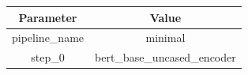 \begin{tabular}{|c||c|}
\toprule
Parameter & Value \\ \midrule
\midrule
pipeline\_name & minimal \\ \midrule
step\_0 & bert\_base\_uncased\_encoder \\ \midrule
\bottomrule
\end{tabular}
